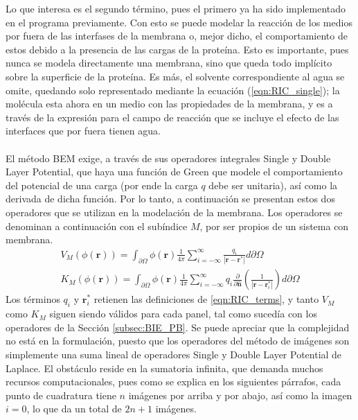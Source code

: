\documentclass[12pt, oneside, numbers, spanish]{ezthesis}
\numberwithin{equation}{section}
\begin{document}
Lo que interesa es el segundo término, pues el primero ya ha sido implementado en el programa previamente. Con esto se puede modelar la reacción de los medios por fuera de las interfases de la membrana o, mejor dicho, el comportamiento de estos debido a la presencia de las cargas de la proteína. Esto es importante, pues nunca se modela directamente una membrana, sino que queda todo implícito sobre la superficie de la proteína. Es más, el solvente correspondiente al agua se omite, quedando solo representado mediante la ecuación (\ref{eqn:RIC_single}); la molécula esta ahora en un medio con las propiedades de la membrana, y es a través de la expresión para el campo de reacción que se incluye el efecto de las interfaces que por fuera tienen agua.\\\\
El método BEM exige, a través de sus operadores integrales Single y Double Layer Potential, que haya una función de Green que modele el comportamiento del potencial de una carga (por ende la carga $q$ debe ser unitaria), así como la derivada de dicha función. Por lo tanto, a continuación se presentan estos dos operadores que se utilizan en la modelación de la membrana. Los operadores se denominan a continuación con el subíndice $M$, por ser propios de un sistema con membrana.
\begin{align}
V_M(\phi(\mathbf{r})) = \int_{\partial\Omega}\phi(\mathbf{r})\frac{1}{4\pi}\sum_{i=-\infty}^{\infty}\frac{q_i}{|\mathbf{r} - \mathbf{r}^*|}d\partial\Omega \label{eqn:SLOp_Memb}\\
K_M(\phi(\mathbf{r})) = \int_{\partial\Omega}\phi(\mathbf{r})\frac{1}{4\pi}\sum_{i=-\infty}^{\infty}q_i\frac{\partial}{\partial\hat{\mathbf{n}}}\left(\frac{1}{|\mathbf{r} - \mathbf{r}_i^*|}\right)d\partial\Omega \label{eqn:DLOp_Memb}
\end{align}
Los términos $q_i$ y $\mathbf{r}_i^*$ retienen las definiciones de \ref{eqn:RIC_terms}, y tanto $V_M$ como $K_M$ siguen siendo válidos para cada panel, tal como sucedía con los operadores de la Sección \ref{subsec:BIE_PB}. Se puede apreciar que la complejidad no está en la formulación, puesto que los operadores del método de imágenes son simplemente una suma lineal de operadores Single y Double Layer Potential de Laplace. El obstáculo reside en la sumatoria infinita, que demanda muchos recursos computacionales, pues como se explica en los siguientes párrafos, cada punto de cuadratura tiene $n$ imágenes por arriba y por abajo, así como la imagen $i=0$, lo que da un total de $2n + 1$ imágenes.
\end{document}
